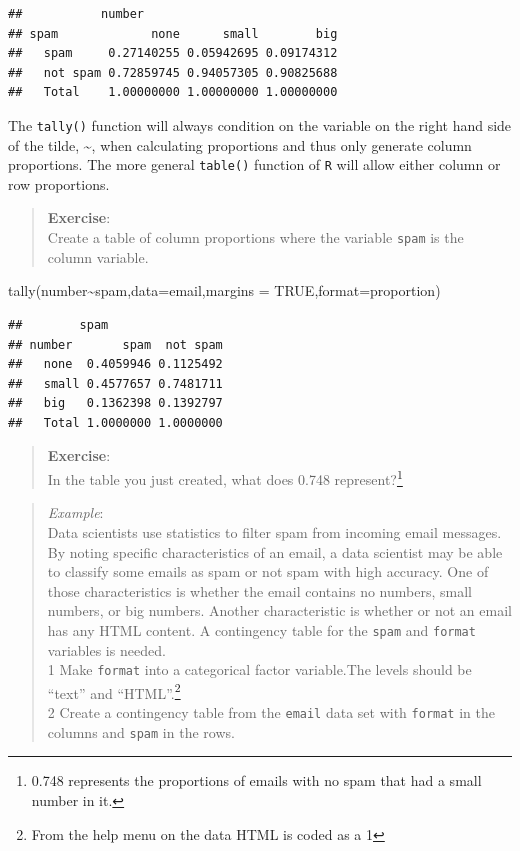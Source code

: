 \documentclass[
]{book}
\newenvironment{Shaded}{\begin{snugshade}}{\end{snugshade}}
\newcommand{\AttributeTok}[1]{\textcolor[rgb]{0.77,0.63,0.00}{#1}}
\newcommand{\ConstantTok}[1]{\textcolor[rgb]{0.00,0.00,0.00}{#1}}
\newcommand{\FunctionTok}[1]{\textcolor[rgb]{0.00,0.00,0.00}{#1}}
\newcommand{\NormalTok}[1]{#1}
\newcommand{\SpecialCharTok}[1]{\textcolor[rgb]{0.00,0.00,0.00}{#1}}
\newcommand{\StringTok}[1]{\textcolor[rgb]{0.31,0.60,0.02}{#1}}
\begin{document}
\begin{verbatim}
##           number
## spam             none      small        big
##   spam     0.27140255 0.05942695 0.09174312
##   not spam 0.72859745 0.94057305 0.90825688
##   Total    1.00000000 1.00000000 1.00000000
\end{verbatim}

The \texttt{tally()} function will always condition on the variable on the right hand side of the tilde, \textasciitilde, when calculating proportions and thus only generate column proportions. The more general \texttt{table()} function of \texttt{R} will allow either column or row proportions.

\begin{quote}
\textbf{Exercise}:\\
Create a table of column proportions where the variable \texttt{spam} is the column variable.
\end{quote}

\begin{Shaded}
\begin{Highlighting}[]
\FunctionTok{tally}\NormalTok{(number}\SpecialCharTok{\textasciitilde{}}\NormalTok{spam,}\AttributeTok{data=}\NormalTok{email,}\AttributeTok{margins =} \ConstantTok{TRUE}\NormalTok{,}\AttributeTok{format=}\StringTok{\textquotesingle{}proportion\textquotesingle{}}\NormalTok{)}
\end{Highlighting}
\end{Shaded}

\begin{verbatim}
##        spam
## number       spam  not spam
##   none  0.4059946 0.1125492
##   small 0.4577657 0.7481711
##   big   0.1362398 0.1392797
##   Total 1.0000000 1.0000000
\end{verbatim}

\begin{quote}
\textbf{Exercise}:\\
In the table you just created, what does 0.748 represent?\footnote{0.748 represents the proportions of emails with no spam that had a small number in it.}
\end{quote}

\begin{quote}
\emph{Example}:\\
Data scientists use statistics to filter spam from incoming email messages. By noting specific characteristics of an email, a data scientist may be able to classify some emails as spam or not spam with high accuracy. One of those characteristics is whether the email contains no numbers, small numbers, or big numbers. Another characteristic is whether or not an email has any HTML content. A contingency table for the \texttt{spam} and \texttt{format} variables is needed.\\
1 Make \texttt{format} into a categorical factor variable.The levels should be ``text'' and ``HTML''.\footnote{From the help menu on the data HTML is coded as a 1}\\
2 Create a contingency table from the \texttt{email} data set with \texttt{format} in the columns and \texttt{spam} in the rows.
\end{quote}
\end{document}
